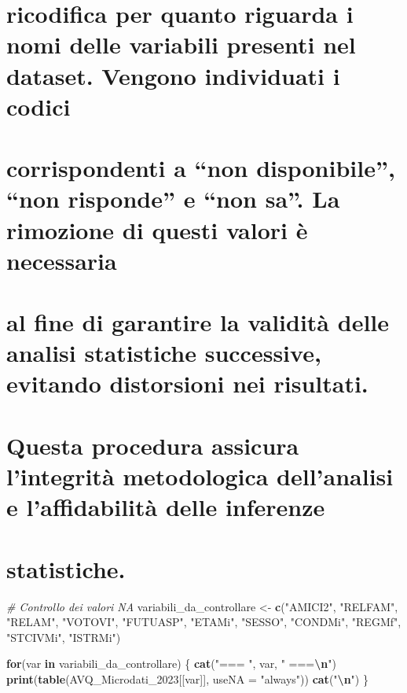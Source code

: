 \documentclass[
]{article}
\newenvironment{Shaded}{\begin{snugshade}}{\end{snugshade}}
\newcommand{\AttributeTok}[1]{\textcolor[rgb]{0.13,0.29,0.53}{#1}}
\newcommand{\CommentTok}[1]{\textcolor[rgb]{0.56,0.35,0.01}{\textit{#1}}}
\newcommand{\ControlFlowTok}[1]{\textcolor[rgb]{0.13,0.29,0.53}{\textbf{#1}}}
\newcommand{\FunctionTok}[1]{\textcolor[rgb]{0.13,0.29,0.53}{\textbf{#1}}}
\newcommand{\NormalTok}[1]{#1}
\newcommand{\OtherTok}[1]{\textcolor[rgb]{0.56,0.35,0.01}{#1}}
\newcommand{\SpecialCharTok}[1]{\textcolor[rgb]{0.81,0.36,0.00}{\textbf{#1}}}
\newcommand{\StringTok}[1]{\textcolor[rgb]{0.31,0.60,0.02}{#1}}
\begin{document}
\section{ricodifica per quanto riguarda i nomi delle variabili presenti
nel dataset. Vengono individuati i
codici}\label{ricodifica-per-quanto-riguarda-i-nomi-delle-variabili-presenti-nel-dataset.-vengono-individuati-i-codici}

\section{corrispondenti a ``non disponibile'', ``non risponde'' e ``non
sa''. La rimozione di questi valori è
necessaria}\label{corrispondenti-a-non-disponibile-non-risponde-e-non-sa.-la-rimozione-di-questi-valori-uxe8-necessaria}

\section{al fine di garantire la validità delle analisi statistiche
successive, evitando distorsioni nei
risultati.}\label{al-fine-di-garantire-la-validituxe0-delle-analisi-statistiche-successive-evitando-distorsioni-nei-risultati.}

\section{Questa procedura assicura l'integrità metodologica dell'analisi
e l'affidabilità delle
inferenze}\label{questa-procedura-assicura-lintegrituxe0-metodologica-dellanalisi-e-laffidabilituxe0-delle-inferenze}

\section{statistiche.}\label{statistiche.}

\begin{Shaded}
\begin{Highlighting}[]
\CommentTok{\# Controllo dei valori NA}
\NormalTok{variabili\_da\_controllare }\OtherTok{\textless{}{-}} \FunctionTok{c}\NormalTok{(}\StringTok{"AMICI2"}\NormalTok{, }\StringTok{"RELFAM"}\NormalTok{, }\StringTok{"RELAM"}\NormalTok{, }\StringTok{"VOTOVI"}\NormalTok{, }\StringTok{"FUTUASP"}\NormalTok{, }
                             \StringTok{"ETAMi"}\NormalTok{, }\StringTok{"SESSO"}\NormalTok{, }\StringTok{"CONDMi"}\NormalTok{, }\StringTok{"REGMf"}\NormalTok{, }\StringTok{"STCIVMi"}\NormalTok{, }\StringTok{"ISTRMi"}\NormalTok{)}

\ControlFlowTok{for}\NormalTok{(var }\ControlFlowTok{in}\NormalTok{ variabili\_da\_controllare) \{}
 \FunctionTok{cat}\NormalTok{(}\StringTok{"=== "}\NormalTok{, var, }\StringTok{" ===}\SpecialCharTok{\textbackslash{}n}\StringTok{"}\NormalTok{)}
 \FunctionTok{print}\NormalTok{(}\FunctionTok{table}\NormalTok{(AVQ\_Microdati\_2023[[var]], }\AttributeTok{useNA =} \StringTok{"always"}\NormalTok{))}
 \FunctionTok{cat}\NormalTok{(}\StringTok{"}\SpecialCharTok{\textbackslash{}n}\StringTok{"}\NormalTok{)}
\NormalTok{\}}
\end{Highlighting}
\end{Shaded}
\end{document}
